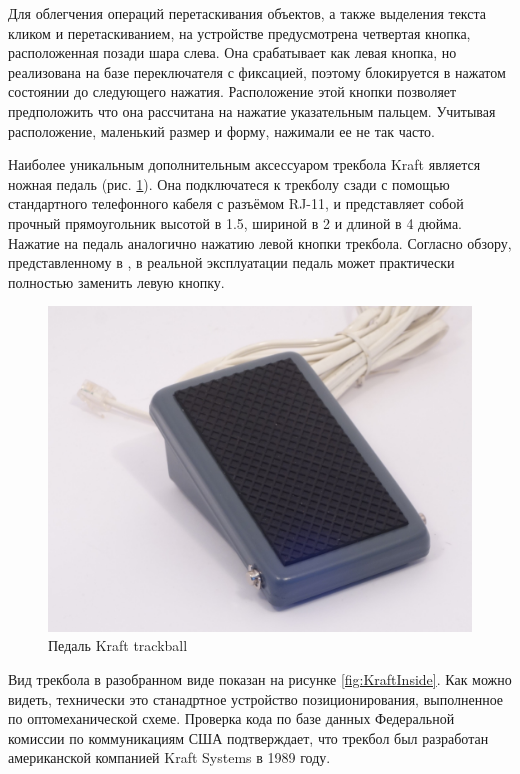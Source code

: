 \documentclass[11pt, a4paper]{article}
\begin{document}
Для облегчения операций перетаскивания объектов, а также выделения текста кликом и перетаскиванием, на устройстве предусмотрена четвертая кнопка, расположенная позади шара слева. Она срабатывает как левая кнопка, но реализована на базе переключателя с фиксацией, поэтому блокируется в нажатом состоянии до следующего нажатия. Расположение этой кнопки позволяет предположить что она рассчитана на нажатие указательным пальцем. Учитывая расположение, маленький размер и форму, нажимали ее не так часто.

Наиболее уникальным дополнительным аксессуаром трекбола Kraft является ножная педаль (рис. \ref{fig:KraftPedal}). Она подключатеся к трекболу сзади с помощью стандартного телефонного кабеля с разъёмом RJ-11, и представляет собой прочный прямоугольник высотой в 1.5, шириной в 2 и длиной в 4 дюйма. Нажатие на педаль аналогично нажатию левой кнопки трекбола. Согласно обзору, представленному в \cite{kraftwithpedal}, в реальной эксплуатации педаль может практически полностью заменить левую кнопку.

\begin{figure}[h]
    \centering
    \includegraphics[scale=0.4]{1990_kraft_toptrack/2.7.jpg}
    \caption{Педаль Kraft trackball}
    \label{fig:KraftPedal}
\end{figure}

Вид трекбола в разобранном виде показан на рисунке \ref{fig:KraftInside}. Как можно видеть, технически это станадртное устройство позиционирования, выполненное по оптомеханической схеме. Проверка кода по базе данных Федеральной комиссии по коммуникациям США подтверждает, что трекбол был разработан американской компанией Kraft Systems в 1989 году.
\end{document}
